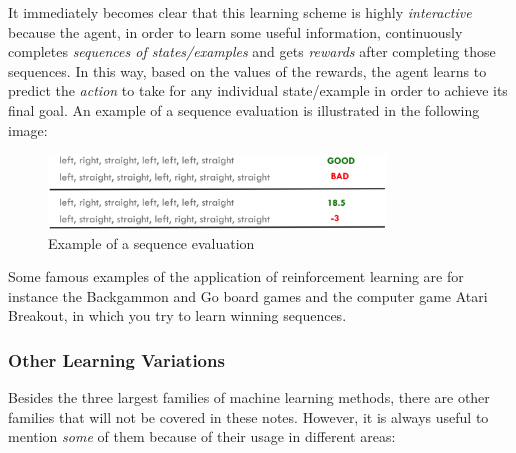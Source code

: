 \vspace{5mm}

\newpage

It immediately becomes clear that this learning scheme is highly
\emph{interactive} because the agent, in order to learn some useful
information, continuously completes \emph{sequences of states/examples}
and gets \emph{rewards} after completing those sequences. In this way,
based on the values of the rewards, the agent learns to predict the
\emph{action} to take for any individual state/example in order to
achieve its final goal. An example of a sequence evaluation is
illustrated in the following image:

\vspace{5mm}

\begin{figure}[h]
      \centering
      \includegraphics[width=0.8\textwidth]{../img/Sequence_example}
      \caption{Example of a sequence evaluation}
\end{figure}

\vspace{5mm}

Some famous examples of the application of reinforcement learning are
for instance the Backgammon and Go board games and the computer game
Atari Breakout, in which you try to learn winning sequences.

\subsubsection{Other Learning Variations}

Besides the three largest families of machine learning methods,
there are other families that will not be covered in these notes.
However, it is always useful to mention \emph{some} of them because
of their usage in different areas:

